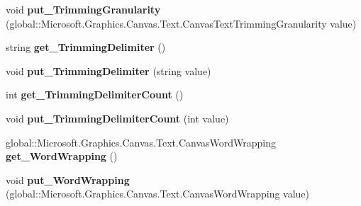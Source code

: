 \begin{DoxyCompactItemize}
\mbox{\label{interface_microsoft_1_1_graphics_1_1_canvas_1_1_text_1_1_i_canvas_text_layout_a6159ff2880908ea328720398d78bb388}} 
void {\bfseries put\+\_\+\+Trimming\+Granularity} (global\+::\+Microsoft.\+Graphics.\+Canvas.\+Text.\+Canvas\+Text\+Trimming\+Granularity value)
\item 
\mbox{\label{interface_microsoft_1_1_graphics_1_1_canvas_1_1_text_1_1_i_canvas_text_layout_ae248cefb5cdb08879e9a5324630e97d6}} 
string {\bfseries get\+\_\+\+Trimming\+Delimiter} ()
\item 
\mbox{\label{interface_microsoft_1_1_graphics_1_1_canvas_1_1_text_1_1_i_canvas_text_layout_a98a50566a034e585369dc4b5b61fca2b}} 
void {\bfseries put\+\_\+\+Trimming\+Delimiter} (string value)
\item 
\mbox{\label{interface_microsoft_1_1_graphics_1_1_canvas_1_1_text_1_1_i_canvas_text_layout_a4e5e0c2a157d8f5e600e2dd3ac83d47a}} 
int {\bfseries get\+\_\+\+Trimming\+Delimiter\+Count} ()
\item 
\mbox{\label{interface_microsoft_1_1_graphics_1_1_canvas_1_1_text_1_1_i_canvas_text_layout_a7f70f45b494c4711ae59c8639f245a54}} 
void {\bfseries put\+\_\+\+Trimming\+Delimiter\+Count} (int value)
\item 
\mbox{\label{interface_microsoft_1_1_graphics_1_1_canvas_1_1_text_1_1_i_canvas_text_layout_afbb8fcd40e47ef1832d9fd70aafbc3c6}} 
global\+::\+Microsoft.\+Graphics.\+Canvas.\+Text.\+Canvas\+Word\+Wrapping {\bfseries get\+\_\+\+Word\+Wrapping} ()
\item 
\mbox{\label{interface_microsoft_1_1_graphics_1_1_canvas_1_1_text_1_1_i_canvas_text_layout_a9fd193e537a381cd8b74d7a6788b09b8}} 
void {\bfseries put\+\_\+\+Word\+Wrapping} (global\+::\+Microsoft.\+Graphics.\+Canvas.\+Text.\+Canvas\+Word\+Wrapping value)

\end{DoxyCompactItemize}
